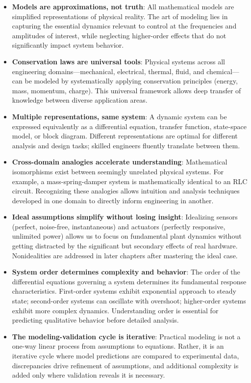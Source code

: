 \begin{keyconceptbox}[title=Key Takeaways: System Modeling]
\begin{itemize}
    \item \textbf{Models are approximations, not truth}: All mathematical models are simplified representations of physical reality. The art of modeling lies in capturing the essential dynamics relevant to control at the frequencies and amplitudes of interest, while neglecting higher-order effects that do not significantly impact system behavior.

    \item \textbf{Conservation laws are universal tools}: Physical systems across all engineering domains---mechanical, electrical, thermal, fluid, and chemical---can be modeled by systematically applying conservation principles (energy, mass, momentum, charge). This universal framework allows deep transfer of knowledge between diverse application areas.

    \item \textbf{Multiple representations, same system}: A dynamic system can be expressed equivalently as a differential equation, transfer function, state-space model, or block diagram. Different representations are optimal for different analysis and design tasks; skilled engineers fluently translate between them.

    \item \textbf{Cross-domain analogies accelerate understanding}: Mathematical isomorphisms exist between seemingly unrelated physical systems. For example, a mass-spring-damper system is mathematically identical to an RLC circuit. Recognizing these analogies allows intuition and analysis techniques developed in one domain to directly inform engineering in another.

    \item \textbf{Ideal assumptions simplify without losing insight}: Idealizing sensors (perfect, noise-free, instantaneous) and actuators (perfectly responsive, unlimited power) allows us to focus on fundamental plant dynamics without getting distracted by the significant but secondary effects of real hardware. Nonidealities are addressed in later chapters after mastering the ideal case.

    \item \textbf{System order determines complexity and behavior}: The order of the differential equations governing a system determines its fundamental response characteristics. First-order systems exhibit exponential approach to steady state; second-order systems can oscillate with overshoot; higher-order systems exhibit more complex dynamics. Understanding order is essential for predicting qualitative behavior before detailed analysis.

    \item \textbf{The modeling-validation cycle is iterative}: Practical modeling is not a one-way linear process from assumptions to equations. Rather, it is an iterative cycle where model predictions are compared to experimental data, discrepancies drive refinement of assumptions, and additional complexity is added only where validation reveals it is necessary.
\end{itemize}
\end{keyconceptbox}
